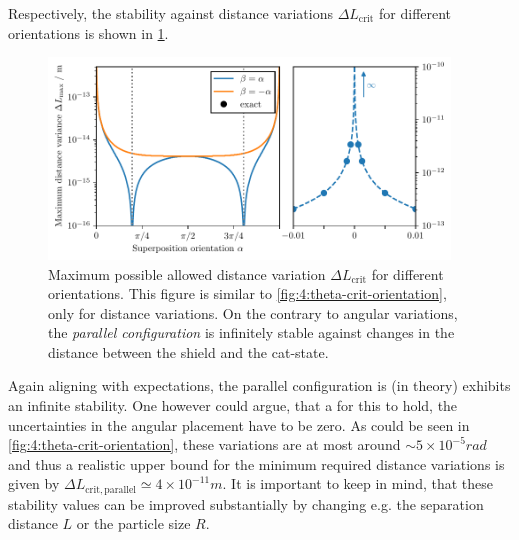 Respectively, the stability against distance variations $\Delta L_\mathrm{crit}$ for different orientations is shown in \cref{fig:4:L-crit-orientation}.
\begin{figure}[!htbp]
  \centering
  \includegraphics[width=0.95\textwidth]{./../figures/L-variance/L-max-orientation-complete.pdf}
  \caption{Maximum possible allowed distance variation $\Delta L_\mathrm{crit}$ for different orientations. This figure is similar to \cref{fig:4:theta-crit-orientation}, only for distance variations. On the contrary to angular variations, the \emph{parallel configuration} is infinitely stable against changes in the distance between the shield and the cat-state.}
  \label{fig:4:L-crit-orientation}
\end{figure}
Again aligning with expectations, the parallel configuration is (in theory) exhibits an infinite stability.
One however could argue, that a for this to hold, the uncertainties in the angular placement have to be zero. As could be seen in \cref{fig:4:theta-crit-orientation}, these variations are at most around $\sim 5 \times 10^{-5}\si{rad}$ and thus a realistic upper bound for the minimum required distance variations is given by $\Delta L_\mathrm{crit,parallel} \simeq 4\times 10^{-11}\si{m}$.
It is important to keep in mind, that these stability values can be improved substantially by changing e.g. the separation distance $L$ or the particle size $R$.

